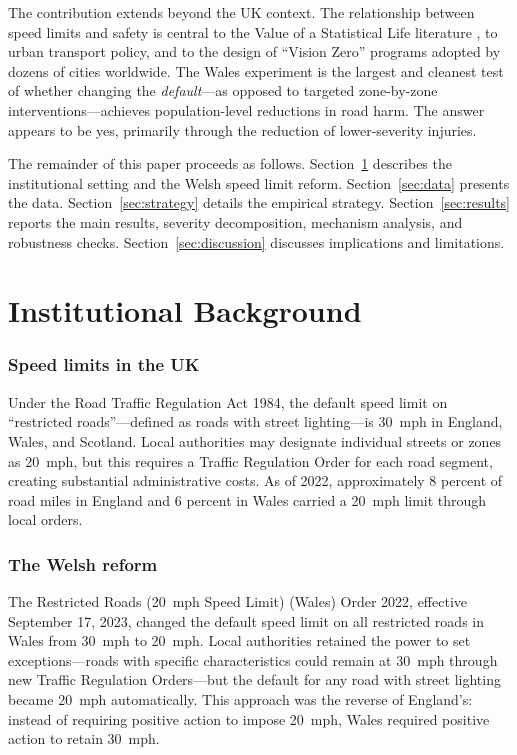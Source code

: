 \documentclass[12pt]{article}
\begin{document}
The contribution extends beyond the UK context. The relationship between speed limits and safety is central to the Value of a Statistical Life literature \citep{ashenfelter2004}, to urban transport policy, and to the design of ``Vision Zero'' programs adopted by dozens of cities worldwide. The Wales experiment is the largest and cleanest test of whether changing the \textit{default}---as opposed to targeted zone-by-zone interventions---achieves population-level reductions in road harm. The answer appears to be yes, primarily through the reduction of lower-severity injuries.

The remainder of this paper proceeds as follows. Section~\ref{sec:background} describes the institutional setting and the Welsh speed limit reform. Section~\ref{sec:data} presents the data. Section~\ref{sec:strategy} details the empirical strategy. Section~\ref{sec:results} reports the main results, severity decomposition, mechanism analysis, and robustness checks. Section~\ref{sec:discussion} discusses implications and limitations.

\section{Institutional Background}
\label{sec:background}

\subsubsection*{Speed limits in the UK} Under the Road Traffic Regulation Act 1984, the default speed limit on ``restricted roads''---defined as roads with street lighting---is 30~mph in England, Wales, and Scotland. Local authorities may designate individual streets or zones as 20~mph, but this requires a Traffic Regulation Order for each road segment, creating substantial administrative costs. As of 2022, approximately 8 percent of road miles in England and 6 percent in Wales carried a 20~mph limit through local orders.

\subsubsection*{The Welsh reform} The Restricted Roads (20~mph Speed Limit) (Wales) Order 2022, effective September 17, 2023, changed the default speed limit on all restricted roads in Wales from 30~mph to 20~mph. Local authorities retained the power to set exceptions---roads with specific characteristics could remain at 30~mph through new Traffic Regulation Orders---but the default for any road with street lighting became 20~mph automatically. This approach was the reverse of England's: instead of requiring positive action to impose 20~mph, Wales required positive action to retain 30~mph.
\end{document}
